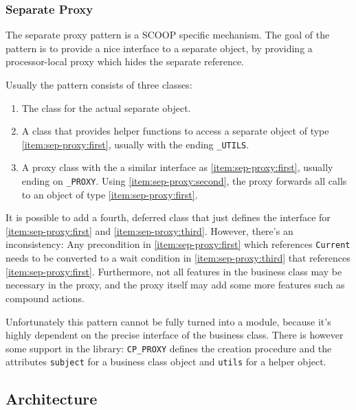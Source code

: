 \documentclass[a4paper,10pt]{report}
\begin{document}
\subsubsection{Separate Proxy}

The separate proxy pattern is a SCOOP specific mechanism.
The goal of the pattern is to provide a nice interface to a separate object, by providing a processor-local proxy which hides the separate reference.

Usually the pattern consists of three classes:
\begin{enumerate} [label=(\arabic*)]
 \item\label{item:sep-proxy:first} The class for the actual separate object.
 \item\label{item:sep-proxy:second} A class that provides helper functions to access a separate object of type \ref{item:sep-proxy:first}, usually with the ending \lstinline!_UTILS!.
 \item\label{item:sep-proxy:third} A proxy class with the a similar interface as \ref{item:sep-proxy:first}, usually ending on \lstinline!_PROXY!.
    Using \ref{item:sep-proxy:second}, the proxy forwards all calls to an object of type \ref{item:sep-proxy:first}.
\end{enumerate}


It is possible to add a fourth, deferred class that just defines the interface for \ref{item:sep-proxy:first} and \ref{item:sep-proxy:third}.
However, there's an inconsistency: 
Any precondition in \ref{item:sep-proxy:first} which references \lstinline!Current! needs to be converted to a wait condition in \ref{item:sep-proxy:third} that references \ref{item:sep-proxy:first}.
Furthermore, not all features in the business class may be necessary in the proxy, and the proxy itself may add some more features such as compound actions.

Unfortunately this pattern cannot be fully turned into a module, because it's highly dependent on the precise interface of the business class.
There is however some support in the library: 
\lstinline!CP_PROXY! defines the creation procedure and the attributes \lstinline!subject! for a business class object and \lstinline!utils! for a helper object.


\subsection {Architecture}
\label{sec:modules}
\end{document}
